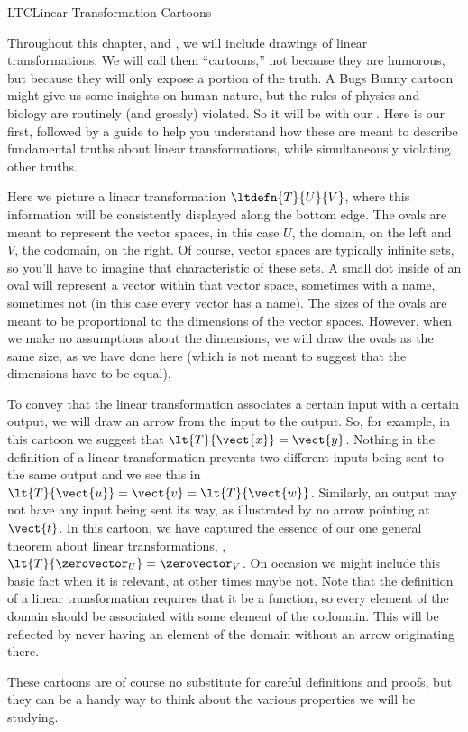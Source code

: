 \begin{subsect}{LTC}{Linear Transformation Cartoons}
%
\begin{para}Throughout this chapter, and , we will include drawings of linear transformations.  We will call them ``cartoons,'' not because they are humorous, but because they will only expose a portion of the truth.  A Bugs Bunny cartoon might give us some insights on human nature, but the rules of physics and biology are routinely (and grossly) violated.  So it will be with our .  Here is our first, followed by a guide to help you understand how these are meant to describe fundamental truths about linear transformations, while simultaneously violating other truths.
%
\end{para}
%
\begin{para}Here we picture a linear transformation $\ltdefn{T}{U}{V}$, where this information will be consistently displayed along the bottom edge.  The ovals are meant to represent the vector spaces, in this case $U$, the domain, on the left and $V$, the codomain, on the right.  Of course, vector spaces are typically infinite sets, so you'll have to imagine that characteristic of these sets.  A small dot inside of an oval will represent a vector within that vector space, sometimes with a name, sometimes not (in this case every vector has a name).  The sizes of the ovals are meant to be proportional to the dimensions of the vector spaces.  However, when we make no assumptions about the dimensions, we will draw the ovals as the same size, as we have done here (which is not meant to suggest that the dimensions have to be equal).\end{para}
%
\begin{para}To convey that the linear transformation associates a certain input with a certain output, we will draw an arrow from the input to the output.  So, for example, in this cartoon we suggest that $\lt{T}{\vect{x}}=\vect{y}$.  Nothing in the definition of a linear transformation prevents two different inputs being sent to the same output and we see this in $\lt{T}{\vect{u}}=\vect{v}=\lt{T}{\vect{w}}$.  Similarly, an output may not have any input being sent its way, as illustrated by no arrow pointing at $\vect{t}$.  In this cartoon, we have captured the essence of our one general theorem about linear transformations, , $\lt{T}{\zerovector_U}=\zerovector_V$.  On occasion we might include this basic fact when it is relevant, at other times maybe not.  Note that the definition of a linear transformation requires that it be a function, so every element of the domain should be associated with some element of the codomain.  This will be reflected by never having an element of the domain without an arrow originating there.\end{para}
%
\begin{para}These cartoons are of course no substitute for careful definitions and proofs, but they can be a handy way to think about the various properties we will be studying.\end{para}
%
\end{subsect}
